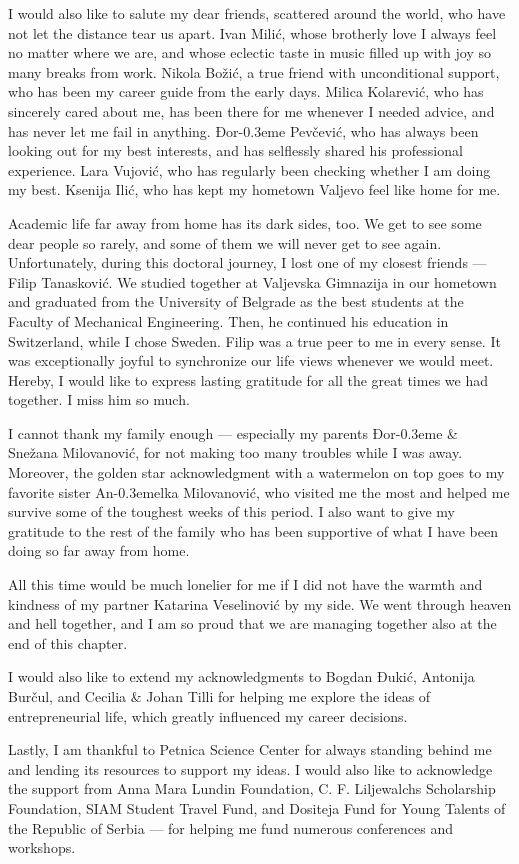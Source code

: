 \documentclass{UUThesisTemplate}
\newcommand*\strike[1]{\bibnamefont{#1}\kern-0.3em{\raisebox{0.75ex}{-}}}
\begin{document}
{\par
I would also like to salute my dear friends, scattered around the world, who have not let the distance tear us apart. Ivan Milić, whose brotherly love I always feel no matter where we are, and whose eclectic taste in music filled up with joy so many breaks from work. Nikola Božić, a true friend with unconditional support, who has been my career guide from the early days. Milica Kolarević, who has sincerely cared about me, has been there for me whenever I needed advice, and has never let me fail in anything. Đor\strike{d}e Pevčević, who has always been looking out for my best interests, and has selflessly shared his professional experience. Lara Vujović, who has regularly been checking whether I am doing my best. Ksenija Ilić, who has kept my hometown Valjevo feel like home for me.
\par
Academic life far away from home has its dark sides, too. We get to see some dear people so rarely, and some of them we will never get to see again. Unfortunately, during this doctoral journey, I lost one of my closest friends --- Filip Tanasković. We studied together at Valjevska Gimnazija in our hometown and graduated from the University of Belgrade as the best students at the Faculty of Mechanical Engineering. Then, he continued his education in Switzerland, while I chose Sweden. Filip was a true peer to me in every sense. It was exceptionally joyful to synchronize our life views whenever we would meet. Hereby, I would like to express lasting gratitude for all the great times we had together. I miss him so much.

\par
I cannot thank my family enough --- especially my parents Đor\strike{d}e \& Snežana Milovanović, for not making too many troubles while I was away. Moreover, the golden star acknowledgment with a watermelon on top goes to my favorite sister An\strike{d}elka Milovanović, who visited me the most and helped me survive some of the toughest weeks of this period. I also want to give my gratitude to the rest of the family who has been supportive of what I have been doing so far away from home. 

\par
All this time would be much lonelier for me if I did not have the warmth and kindness of my partner Katarina Veselinović by my side. We went through heaven and hell together, and I am so proud that we are managing together also at the end of this chapter.

\par
I would also like to extend my acknowledgments to Bogdan Đukić, Antonija Burčul, and Cecilia \& Johan Tilli for helping me explore the ideas of entrepreneurial life, which greatly influenced my career decisions. 

\par
Lastly, I am thankful to Petnica Science Center for always standing behind me and lending its resources to support my ideas. I would also like to acknowledge the support from Anna Mara Lundin Foundation, C. F. Liljewalchs Scholarship Foundation, SIAM Student Travel Fund, and Dositeja Fund for Young Talents of the Republic of Serbia --- for helping me fund numerous conferences and workshops.
}
\end{document}
